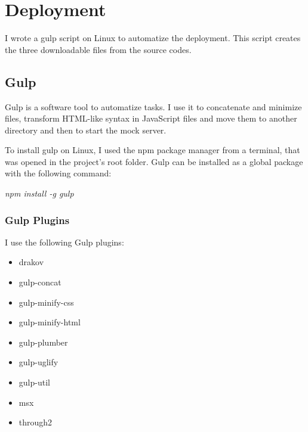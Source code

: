 \chapter{Deployment}


I wrote a gulp script on Linux to automatize the deployment. This script creates the three downloadable files from the source codes.

\section{Gulp}
\label{gulp}

Gulp is a software tool to automatize tasks. I use it to concatenate and minimize files, transform HTML-like syntax in JavaScript files and move them to another directory and then to start the mock server.

To install gulp on Linux, I used the npm package manager from a terminal, that was opened in the project's root folder. Gulp can be installed as a global package with the following command:


\emph{npm install -g gulp}

\subsection{Gulp Plugins}

I use the following Gulp plugins:

\begin{itemize}
	\item drakov
	\item gulp-concat
	\item gulp-minify-css
	\item gulp-minify-html
	\item gulp-plumber		
	\item gulp-uglify
	\item gulp-util
	\item msx
	\item through2
\end{itemize}
	

